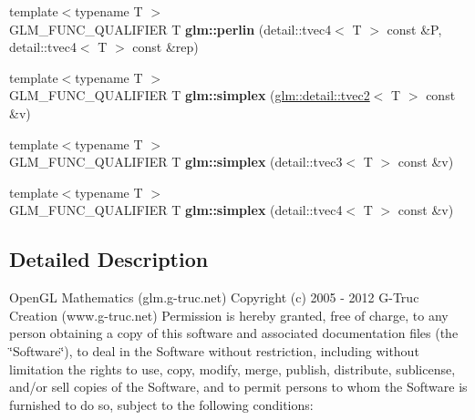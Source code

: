\begin{DoxyCompactItemize}
\item 
\hypertarget{namespaceglm_a91e347e1dc525eacb73aa8264cd453d9}{{\footnotesize template$<$typename T $>$ }\\G\-L\-M\-\_\-\-F\-U\-N\-C\-\_\-\-Q\-U\-A\-L\-I\-F\-I\-E\-R T {\bfseries glm\-::perlin} (detail\-::tvec4$<$ T $>$ const \&P, detail\-::tvec4$<$ T $>$ const \&rep)}\label{namespaceglm_a91e347e1dc525eacb73aa8264cd453d9}

\item 
\hypertarget{namespaceglm_ac4117960bae18a7e9401bfe1dc7cc3b9}{{\footnotesize template$<$typename T $>$ }\\G\-L\-M\-\_\-\-F\-U\-N\-C\-\_\-\-Q\-U\-A\-L\-I\-F\-I\-E\-R T {\bfseries glm\-::simplex} (\hyperlink{structglm_1_1detail_1_1tvec2}{glm\-::detail\-::tvec2}$<$ T $>$ const \&v)}\label{namespaceglm_ac4117960bae18a7e9401bfe1dc7cc3b9}

\item 
\hypertarget{namespaceglm_a40d0ad04932c7d2ba3abdf216e6c9f93}{{\footnotesize template$<$typename T $>$ }\\G\-L\-M\-\_\-\-F\-U\-N\-C\-\_\-\-Q\-U\-A\-L\-I\-F\-I\-E\-R T {\bfseries glm\-::simplex} (detail\-::tvec3$<$ T $>$ const \&v)}\label{namespaceglm_a40d0ad04932c7d2ba3abdf216e6c9f93}

\item 
\hypertarget{namespaceglm_a3044f493ace43d71eaad6b49cd9f35a9}{{\footnotesize template$<$typename T $>$ }\\G\-L\-M\-\_\-\-F\-U\-N\-C\-\_\-\-Q\-U\-A\-L\-I\-F\-I\-E\-R T {\bfseries glm\-::simplex} (detail\-::tvec4$<$ T $>$ const \&v)}\label{namespaceglm_a3044f493ace43d71eaad6b49cd9f35a9}

\end{DoxyCompactItemize}


\subsection{Detailed Description}
Open\-G\-L Mathematics (glm.\-g-\/truc.\-net) Copyright (c) 2005 -\/ 2012 G-\/\-Truc Creation (www.\-g-\/truc.\-net) Permission is hereby granted, free of charge, to any person obtaining a copy of this software and associated documentation files (the \char`\"{}\-Software\char`\"{}), to deal in the Software without restriction, including without limitation the rights to use, copy, modify, merge, publish, distribute, sublicense, and/or sell copies of the Software, and to permit persons to whom the Software is furnished to do so, subject to the following conditions\-:

